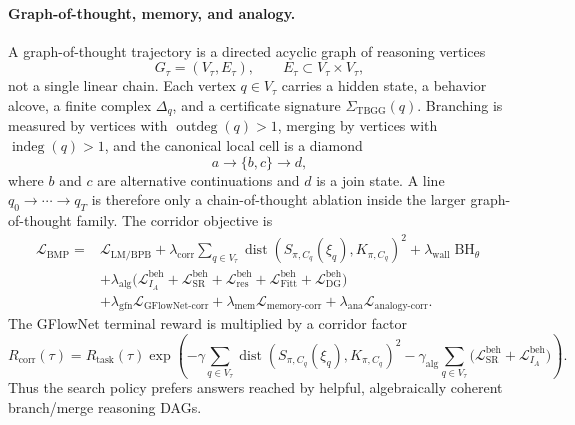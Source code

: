 \documentclass[11pt]{article}
\theoremstyle{definition}
\theoremstyle{plain}
\theoremstyle{remark}
\numberwithin{equation}{section}
\newcommand{\dist}{\operatorname{dist}}
\begin{document}
\paragraph{Graph-of-thought, memory, and analogy.}
A graph-of-thought trajectory is a directed acyclic graph of reasoning vertices
\begin{equation}
  G_\tau=(V_\tau,E_\tau),\qquad E_\tau\subset V_\tau\times V_\tau,
\end{equation}
not a single linear chain.  Each vertex $q\in V_\tau$ carries a hidden state, a behavior alcove, a finite complex $\Delta_q$, and a certificate signature $\Sigma_{\mathrm{TBGG}}(q)$.  Branching is measured by vertices with $\operatorname{outdeg}(q)>1$, merging by vertices with $\operatorname{indeg}(q)>1$, and the canonical local cell is a diamond
\begin{equation}
  a\longrightarrow\{b,c\}\longrightarrow d,
\end{equation}
where $b$ and $c$ are alternative continuations and $d$ is a join state.  A line $q_0\to\cdots\to q_T$ is therefore only a chain-of-thought ablation inside the larger graph-of-thought family.  The corridor objective is
\begin{equation}
\begin{aligned}
  \mathcal L_{\mathrm{BMP}}
  ={}&
  \mathcal L_{\mathrm{LM/BPB}}
  +\lambda_{\mathrm{corr}}\sum_{q\in V_\tau}\dist(S_{\pi,C_q}(\xi_q),K_{\pi,C_q})^2
  +\lambda_{\mathrm{wall}}\operatorname{BH}_\theta\\
  &+\lambda_{\mathrm{alg}}
  \bigl(\mathcal L_{I_A}^{\mathrm{beh}}
       +\mathcal L_{\mathrm{SR}}^{\mathrm{beh}}
       +\mathcal L_{\mathrm{res}}^{\mathrm{beh}}
       +\mathcal L_{\mathrm{Fitt}}^{\mathrm{beh}}
       +\mathcal L_{\mathrm{DG}}^{\mathrm{beh}}\bigr)\\
  &+\lambda_{\mathrm{gfn}}\mathcal L_{\mathrm{GFlowNet\text{-}corr}}
  +\lambda_{\mathrm{mem}}\mathcal L_{\mathrm{memory\text{-}corr}}
  +\lambda_{\mathrm{ana}}\mathcal L_{\mathrm{analogy\text{-}corr}} .
\end{aligned}
\end{equation}
The GFlowNet terminal reward is multiplied by a corridor factor
\begin{equation}
  R_{\mathrm{corr}}(\tau)=
  R_{\mathrm{task}}(\tau)
  \exp\left(-\gamma\sum_{q\in V_\tau}\dist(S_{\pi,C_q}(\xi_q),K_{\pi,C_q})^2
  -\gamma_{\mathrm{alg}}\sum_{q\in V_\tau}
  \bigl(\mathcal L_{\mathrm{SR}}^{\mathrm{beh}}+\mathcal L_{I_A}^{\mathrm{beh}}\bigr)\right).
\end{equation}
Thus the search policy prefers answers reached by helpful, algebraically coherent branch/merge reasoning DAGs.
\end{document}
